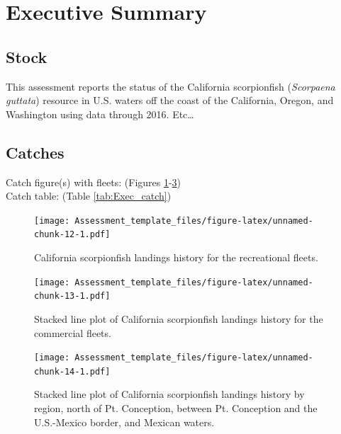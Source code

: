 \documentclass[12pt,]{article}
\begin{document}
{
\setcounter{tocdepth}{4}
\tableofcontents
}
\setlength{\parskip}{5mm plus1mm minus1mm} \pagebreak

 \setcounter{page}{1}
\renewcommand{\thefigure}{\alph{figure}}
\renewcommand{\thetable}{\alph{table}}

\section*{Executive Summary}\label{executive-summary}

\subsection*{Stock}\label{stock}

This assessment reports the status of the California scorpionfish
(\emph{Scorpaena guttata}) resource in U.S. waters off the coast of the
California, Oregon, and Washington using data through 2016. Etc\ldots{}

\subsection*{Catches}\label{catches}

Catch figure(s) with fleets: (Figures
\ref{fig:Exec_catch1}-\ref{fig:Exec_catch3})\\
Catch table: (Table \ref{tab:Exec_catch})

\FloatBarrier

\begin{figure}[htbp]
\centering
\texttt{[image: Assessment\_template\_files/figure-latex/unnamed-chunk-12-1.pdf]}
\caption{California scorpionfish landings history for the recreational
fleets. \label{fig:Exec_catch1}}
\end{figure}

\begin{figure}[htbp]
\centering
\texttt{[image: Assessment\_template\_files/figure-latex/unnamed-chunk-13-1.pdf]}
\caption{Stacked line plot of California scorpionfish landings history
for the commercial fleets. \label{fig:Exec_catch2}}
\end{figure}

\begin{figure}[htbp]
\centering
\texttt{[image: Assessment\_template\_files/figure-latex/unnamed-chunk-14-1.pdf]}
\caption{Stacked line plot of California scorpionfish landings history
by region, north of Pt. Conception, between Pt. Conception and the
U.S.-Mexico border, and Mexican waters. \label{fig:Exec_catch3}}
\end{figure}
\end{document}
